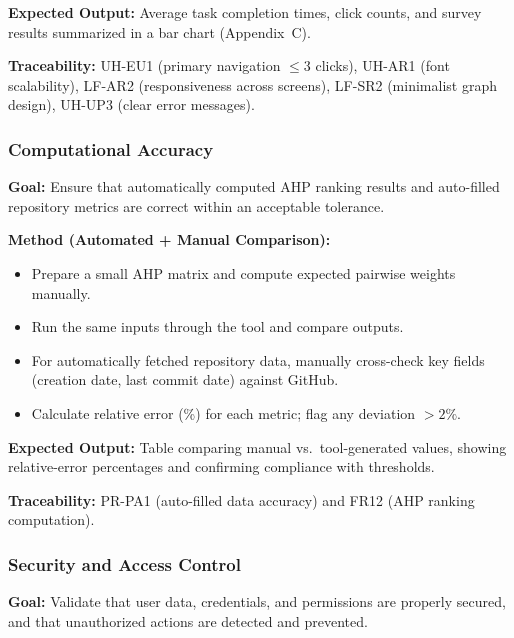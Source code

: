 \documentclass[12pt, titlepage]{article}
\begin{document}
\textbf{Expected Output:} Average task completion times, click counts, and survey results summarized in a bar chart (Appendix~C).

\textbf{Traceability:} UH-EU1 (primary navigation \(\le 3\) clicks), UH-AR1 (font scalability), LF-AR2 (responsiveness across screens), LF-SR2 (minimalist graph design), UH-UP3 (clear error messages).

\subsubsection{Computational Accuracy}
\label{subsubsec:accuracy}

\textbf{Goal:} Ensure that automatically computed AHP ranking results and auto-filled repository metrics are correct within an acceptable tolerance.

\textbf{Method (Automated + Manual Comparison):}
\begin{itemize}
  \item Prepare a small AHP matrix and compute expected pairwise weights manually.
  \item Run the same inputs through the tool and compare outputs.
  \item For automatically fetched repository data, manually cross-check key fields (creation date, last commit date) against GitHub.
  \item Calculate relative error (\%) for each metric; flag any deviation \(> 2\%\).
\end{itemize}

\textbf{Expected Output:} Table comparing manual vs.\ tool-generated values, showing relative-error percentages and confirming compliance with thresholds.

\textbf{Traceability:} PR-PA1 (auto-filled data accuracy) and FR12 (AHP ranking computation).

\subsubsection{Security and Access Control}
\label{subsubsec:security}

\textbf{Goal:} Validate that user data, credentials, and permissions are properly secured, and that unauthorized actions are detected and prevented.
\end{document}
